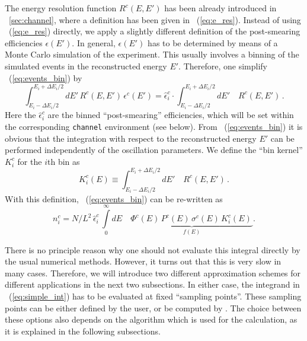 The energy resolution function $R^c(E,E')$ has been already introduced in 
\Sec~\ref{sec:channel}, where a definition
has been given in \eq~(\ref{eq:e_res}). Instead of using
 \eq~(\ref{eq:e_res}) directly, we apply a slightly different
definition of the post-smearing efficiencies $\epsilon(E')$. 
In general, $\epsilon(E')$ has to be
determined by means of a Monte Carlo simulation of the experiment. 
This usually involves a binning of the simulated events in the 
reconstructed energy $E'$. Therefore, one simplify \eq~(\ref{eq:events_bin}) by
\begin{equation}
\label{eq:post_smearing}
\int_{E_i-\Delta E_i/2}^{E_i+\Delta E_i/2} dE' \, R^c(E,E') \, \epsilon^c(E') = \hat\epsilon_i^c \cdot \int_{E_i-\Delta E_i/2}^{E_i+\Delta E_i/2} dE' 
\quad R^c(E,E')\,.
\end{equation}
Here the  $\hat\epsilon_i^c$ are the 
binned ``post-smearing'' efficiencies, which will be set within the corresponding {\tt channel} environment (see below).
From \eq~(\ref{eq:events_bin}) it is obvious that the integration with respect to the reconstructed energy $E'$ can be
performed independently of the oscillation parameters. We define
the ``bin kernel'' $K_i^c$ for the $i$th bin as
\begin{equation}
\label{eq:kernel}
K_i^c(E) \equiv \int_{E_i-\Delta E_i/2}^{E_i+\Delta E_i/2} dE' 
\quad R^c(E,E')\,.
\end{equation}
With this definition, \eq~(\ref{eq:events_bin}) can be re-written as
\begin{equation}
\label{eq:simple_int}
n_i^c=N/L^2 \,
\hat\epsilon_i^c \, \int\limits_0^\infty dE\quad  \underbrace{\Phi^c(E)\,
P^c(E)\,
\sigma^c(E) \, K_i^c(E)\,}_{f(E)}. 
\end{equation}

There is no principle reason why one should not evaluate this integral directly by the usual numerical methods. However, it turns out that this 
is very slow in many cases. Therefore, we will introduce two different approximation schemes for different applications in the next two subsections.
In either case, the integrand in \eq~(\ref{eq:simple_int}) has to be evaluated at fixed ``sampling points''. These sampling points can be 
either defined by the user, or be computed by
\GLOBES . The choice between these options also depends on 
the algorithm which is used for the calculation, as it is explained in the following subsections. 

